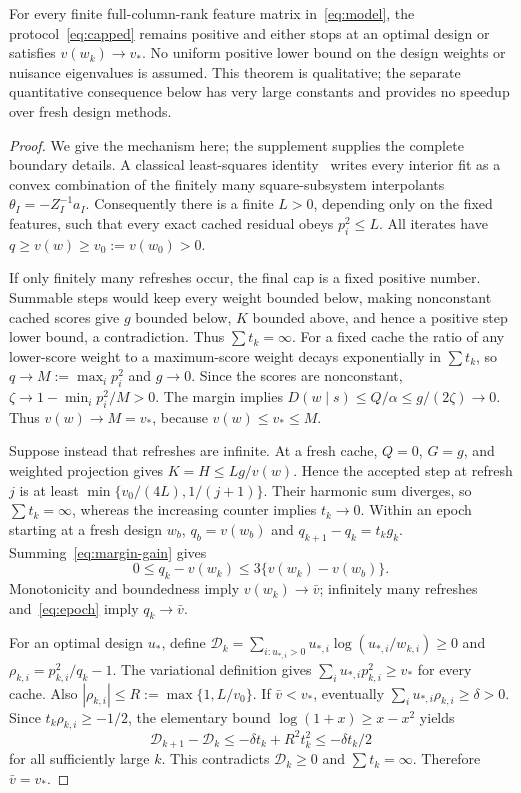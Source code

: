 \documentclass[11pt]{article}
\begin{document}
\begin{theorem}\label{thm:global}
For every finite full-column-rank feature matrix in~\eqref{eq:model}, the protocol~\eqref{eq:capped} remains positive and either stops at an optimal design or satisfies $v(w_k)\to v_*$. No uniform positive lower bound on the design weights or nuisance eigenvalues is assumed. This theorem is qualitative; the separate quantitative consequence below has very large constants and provides no speedup over fresh design methods.
\end{theorem}
\begin{proof}
We give the mechanism here; the supplement supplies the complete boundary details. A classical least-squares identity~\cite{bental1990,derezinski2018,giannelli2024} writes every interior fit as a convex combination of the finitely many square-subsystem interpolants $\theta_I=-Z_I^{-1}a_I$. Consequently there is a finite $L>0$, depending only on the fixed features, such that every exact cached residual obeys $p_i^2\le L$. All iterates have $q\ge v(w)\ge v_0:=v(w_0)>0$.

If only finitely many refreshes occur, the final cap is a fixed positive number. Summable steps would keep every weight bounded below, making nonconstant cached scores give $g$ bounded below, $K$ bounded above, and hence a positive step lower bound, a contradiction. Thus $\sum t_k=\infty$. For a fixed cache the ratio of any lower-score weight to a maximum-score weight decays exponentially in $\sum t_k$, so $q\to M:=\max_i p_i^2$ and $g\to0$. Since the scores are nonconstant, $\zeta\to1-\min_i p_i^2/M>0$. The margin implies
$D(w\mid s)\le Q/\alpha\le g/(2\zeta)\to0$.
Thus $v(w)\to M=v_*$, because $v(w)\le v_*\le M$.

Suppose instead that refreshes are infinite. At a fresh cache, $Q=0$, $G=g$, and weighted projection gives $K=H\le Lg/v(w)$. Hence the accepted step at refresh $j$ is at least $\min\{v_0/(4L),1/(j+1)\}$. Their harmonic sum diverges, so $\sum t_k=\infty$, whereas the increasing counter implies $t_k\to0$.
Within an epoch starting at a fresh design $w_b$, $q_b=v(w_b)$ and $q_{k+1}-q_k=t_kg_k$. Summing~\eqref{eq:margin-gain} gives
\begin{equation}\label{eq:epoch}
 0\le q_k-v(w_k)\le3\{v(w_k)-v(w_b)\}.
\end{equation}
Monotonicity and boundedness imply $v(w_k)\to\bar v$; infinitely many refreshes and~\eqref{eq:epoch} imply $q_k\to\bar v$.

For an optimal design $u_*$, define $\mathcal D_k=\sum_{i:u_{*,i}>0}u_{*,i}\log(u_{*,i}/w_{k,i})\ge0$ and $\rho_{k,i}=p_{k,i}^2/q_k-1$. The variational definition gives $\sum_i u_{*,i}p_{k,i}^2\ge v_*$ for every cache. Also $|\rho_{k,i}|\le R:=\max\{1,L/v_0\}$. If $\bar v<v_*$, eventually $\sum_i u_{*,i}\rho_{k,i}\ge\delta>0$. Since $t_k\rho_{k,i}\ge-1/2$, the elementary bound $\log(1+x)\ge x-x^2$ yields
\[
 \mathcal D_{k+1}-\mathcal D_k\le-\delta t_k+R^2t_k^2\le-\delta t_k/2
\]
for all sufficiently large $k$. This contradicts $\mathcal D_k\ge0$ and $\sum t_k=\infty$. Therefore $\bar v=v_*$.
\end{proof}
\end{document}

